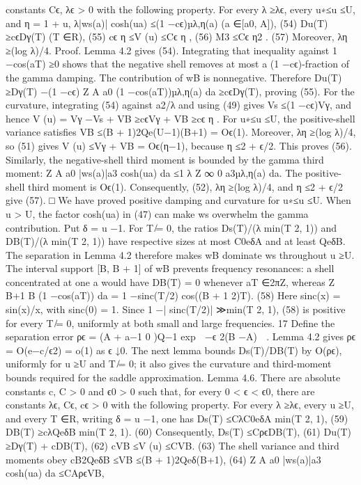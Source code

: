 constants Cϵ, λϵ > 0 with the following property. For every λ ≥λϵ, every u∗≤u ≤U, and
η = 1 + u,
λ|ws(a)| cosh(ua) ≤(1 −cϵ)µλ,η(a)
(a ∈[a0, A]),
(54)
Du(T) ≥cϵDγ(T)
(T ∈R),
(55)
cϵ
η ≤V (u) ≤Cϵ
η ,
(56)
M3 ≤Cϵ
η2 .
(57)
Moreover, λη ≥(log λ)/4.
Proof. Lemma 4.2 gives (54). Integrating that inequality against 1 −cos(aT) ≥0 shows that
the negative shell removes at most a (1 −cϵ)-fraction of the gamma damping. The contribution
of wB is nonnegative. Therefore
Du(T) ≥Dγ(T) −(1 −cϵ)
Z A
a0
(1 −cos(aT))µλ,η(a) da ≥cϵDγ(T),
proving (55).
For the curvature, integrating (54) against a2/λ and using (49) gives Vs ≤(1 −cϵ)Vγ, and
hence
V (u) = Vγ −Vs + VB ≥cϵVγ + VB ≥cϵ
η .
For u∗≤u ≤U, the positive-shell variance satisﬁes
VB ≤(B + 1)2Qe(U−1)(B+1) = Oϵ(1).
Moreover, λη ≥(log λ)/4, so (51) gives
V (u) ≤Vγ + VB = Oϵ(η−1),
because η ≤2 + ϵ/2. This proves (56).
Similarly, the negative-shell third moment is bounded by the gamma third moment:
Z A
a0
|ws(a)|a3 cosh(ua) da ≤1
λ
Z ∞
0
a3µλ,η(a) da.
The positive-shell third moment is Oϵ(1). Consequently, (52), λη ≥(log λ)/4, and η ≤2 + ϵ/2
give (57).
□
We have proved positive damping and curvature for u∗≤u ≤U. When u > U, the factor
cosh(ua) in (47) can make ws overwhelm the gamma contribution. Put δ = u −1. For T ̸= 0,
the ratios Ds(T)/(λ min(T 2, 1)) and DB(T)/(λ min(T 2, 1)) have respective sizes at most C0eδA
and at least QeδB. The separation in Lemma 4.2 therefore makes wB dominate ws throughout
u ≥U.
The interval support [B, B + 1] of wB prevents frequency resonances: a shell concentrated at
one a would have DB(T) = 0 whenever aT ∈2πZ, whereas
Z B+1
B
(1 −cos(aT)) da = 1 −sinc(T/2) cos((B + 1
2)T).
(58)
Here sinc(x) = sin(x)/x, with sinc(0) = 1. Since 1 −| sinc(T/2)| ≫min(T 2, 1), (58) is positive
for every T ̸= 0, uniformly at both small and large frequencies.
17
Deﬁne the separation error
ρϵ = (A + a−1
0 )Q−1 exp

−ϵ
2(B −A)

.
Lemma 4.2 gives ρϵ = O(e−c/ϵ2) = o(1) as ϵ ↓0. The next lemma bounds Ds(T)/DB(T) by
O(ρϵ), uniformly for u ≥U and T ̸= 0; it also gives the curvature and third-moment bounds
required for the saddle approximation.
Lemma 4.6. There are absolute constants c, C > 0 and ϵ0 > 0 such that, for every 0 < ϵ < ϵ0,
there are constants λϵ, Cϵ, cϵ > 0 with the following property. For every λ ≥λϵ, every u ≥U,
and every T ∈R, writing δ = u −1, one has
Ds(T) ≤CλC0eδA min(T 2, 1),
(59)
DB(T) ≥cλQeδB min(T 2, 1).
(60)
Consequently,
Ds(T) ≤CρϵDB(T),
(61)
Du(T) ≥Dγ(T) + cDB(T),
(62)
cVB ≤V (u) ≤CVB.
(63)
The shell variance and third moments obey
cB2QeδB ≤VB ≤(B + 1)2Qeδ(B+1),
(64)
Z A
a0
|ws(a)|a3 cosh(ua) da ≤CAρϵVB,
